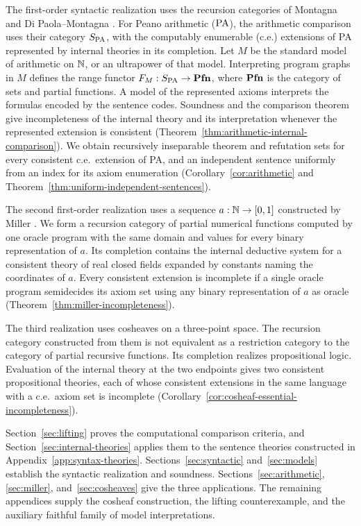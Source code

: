 The first-order syntactic realization uses the recursion categories of
Montagna and Di Paola--Montagna \cite{Montagna,DPM}.
For Peano arithmetic ($\mathrm{PA}$), the arithmetic comparison uses their
category $S_{\mathrm{PA}}$, with the computably enumerable (c.e.) extensions of PA represented by
internal theories in its completion. Let $M$ be the standard model of
arithmetic on $\mathbb N$, or an ultrapower of that model. Interpreting program
graphs in $M$ defines the range functor
$F_M:S_{\mathrm{PA}}\to\mathbf{Pfn}$, where $\mathbf{Pfn}$ is the category of sets and
partial functions. A model of the represented axioms interprets the
formulas encoded by the sentence codes. Soundness and the comparison
theorem give incompleteness of the internal theory and its interpretation
whenever the represented extension is consistent
(Theorem~\ref{thm:arithmetic-internal-comparison}). We obtain recursively
inseparable theorem and refutation sets for every consistent c.e.\
extension of PA, and an independent sentence uniformly from an index for
its axiom enumeration (Corollary~\ref{cor:arithmetic} and
Theorem~\ref{thm:uniform-independent-sentences}).

The second first-order realization uses a sequence
$a:\mathbb N\to[0,1]$ constructed by Miller \cite{Miller2004}.
We form a recursion category of partial numerical functions computed by
one oracle program with the same domain and values for every binary
representation of $a$. Its completion contains the internal deductive
system for a consistent theory of real closed fields expanded by
constants naming the coordinates of $a$. Every consistent extension is
incomplete if a single oracle program semidecides its axiom set using
any binary representation of $a$ as oracle
(Theorem~\ref{thm:miller-incompleteness}).

The third realization uses cosheaves on a three-point space. The
recursion category constructed from them is not equivalent as a
restriction category to the category of partial recursive functions.
Its completion realizes propositional logic. Evaluation of the internal
theory at the two endpoints gives two consistent propositional theories,
each of whose consistent extensions in the same language with a c.e.\
axiom set is incomplete
(Corollary~\ref{cor:cosheaf-essential-incompleteness}).

Section~\ref{sec:lifting} proves the computational comparison criteria,
and Section~\ref{sec:internal-theories} applies them to the sentence
theories constructed in Appendix~\ref{app:syntax-theories}.
Sections~\ref{sec:syntactic} and~\ref{sec:models} establish the
syntactic realization and soundness. Sections~\ref{sec:arithmetic},
\ref{sec:miller}, and~\ref{sec:cosheaves} give the three applications.
The remaining appendices supply the cosheaf construction, the lifting
counterexample, and the auxiliary faithful family of model interpretations.

